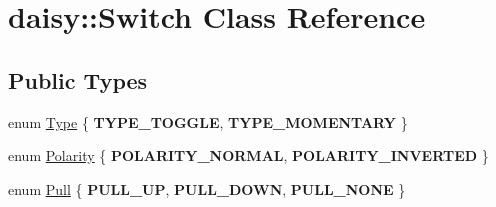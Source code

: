 \hypertarget{classdaisy_1_1_switch}{}\section{daisy\+:\+:Switch Class Reference}
\label{classdaisy_1_1_switch}
\subsection*{Public Types}
\begin{DoxyCompactItemize}
\item 
enum \hyperlink{classdaisy_1_1_switch_a944058682bae079439ddddd42302b483}{Type} \{ {\bfseries T\+Y\+P\+E\+\_\+\+T\+O\+G\+G\+LE}, 
{\bfseries T\+Y\+P\+E\+\_\+\+M\+O\+M\+E\+N\+T\+A\+RY}
 \}
\item 
enum \hyperlink{classdaisy_1_1_switch_aef37136dd1b4cd077ef82a0f62bcfa3d}{Polarity} \{ {\bfseries P\+O\+L\+A\+R\+I\+T\+Y\+\_\+\+N\+O\+R\+M\+AL}, 
{\bfseries P\+O\+L\+A\+R\+I\+T\+Y\+\_\+\+I\+N\+V\+E\+R\+T\+ED}
 \}
\item 
enum \hyperlink{classdaisy_1_1_switch_aa6c26cb923638a248a1d8d3cb1755e51}{Pull} \{ {\bfseries P\+U\+L\+L\+\_\+\+UP}, 
{\bfseries P\+U\+L\+L\+\_\+\+D\+O\+WN}, 
{\bfseries P\+U\+L\+L\+\_\+\+N\+O\+NE}
 \}
\end{DoxyCompactItemize}
